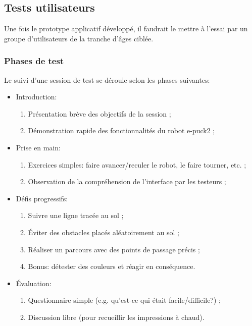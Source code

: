 \subsection{Tests utilisateurs}

Une fois le prototype applicatif développé, il faudrait le mettre à l'essai par un groupe d'utilisateurs de la tranche d'âges ciblée.

\subsubsection{Phases de test}
Le suivi d'une session de test se déroule selon les phases suivantes:
\begin{itemize}
    \item Introduction:
        \begin{enumerate}
            \item Présentation brève des objectifs de la session ;
            \item Démonstration rapide des fonctionnalités du robot e-puck2 ;
        \end{enumerate}

    \item Prise en main:
        \begin{enumerate}
            \item Exercices simples: faire avancer/reculer le robot, le faire tourner, etc. ;
            \item Observation de la compréhension de l'interface par les testeurs ;
        \end{enumerate}

    \item Défis progressifs:
        \begin{enumerate}
            \item Suivre une ligne tracée au sol ;
            \item Éviter des obstacles placés aléatoirement au sol ;
            \item Réaliser un parcours avec des points de passage précis ;
            \item Bonus: détester des couleurs et réagir en conséquence.
        \end{enumerate}

    \item Évaluation: 
        \begin{enumerate}
            \item Questionnaire simple (e.g. qu'est-ce qui était facile/difficile?) ;
            \item Discussion libre (pour recueillir les impressions à chaud).
        \end{enumerate}
\end{itemize}

